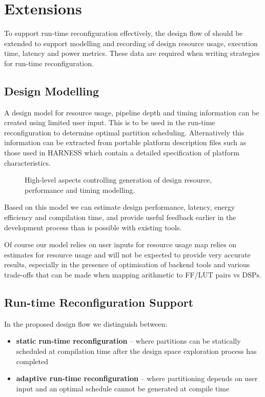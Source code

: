 \section{Extensions}

To support run-time reconfiguration effectively, the design flow of
 should be extended to support modelling and
recording of design resource usage, execution time, latency and power
metrics. These data are required when writing strategies for run-time
reconfiguration.

\subsection{Design Modelling}

A design model for resource usage, pipeline depth and timing
information can be created using limited user input. This is to be
used in the run-time reconfiguration to determine optimal partition
scheduling. Alternatively this information can be extracted from
portable platform description files such as those used in HARNESS
which contain a detailed specification of platform characteristics.

\begin{figure}[!ht]
  \centering
  \def\svgwidth{45em}
  
  \caption{High-level aspects controlling generation of design
    resource, performance and timing modelling.}
  \label{fig:reconfig-design-flow}
\end{figure}

Based on this model we can estimate design performance, latency,
energy efficiency and compilation time, and provide useful feedback
earlier in the development process than is possible with existing
tools.

Of course our model relies on user inputs for resource usage map
relies on estimates for resource usage and will not be expected to
provide very accurate results, especially in the presence of
optimisation of backend tools and various trade-offs that can be made
when mapping arithmetic to FF/LUT pairs vs DSPs.

\subsection{Run-time Reconfiguration Support}

In the proposed design flow we distinguish between:
\begin{itemize}
\item \textbf{static run-time reconfiguration} -- where partitions can
  be statically scheduled at compilation time after the design space
  exploration process has completed
\item \textbf{adaptive run-time reconfiguration} -- where partitioning
  depends on user input and an optimal schedule cannot be generated at
  compile time
\end{itemize}

